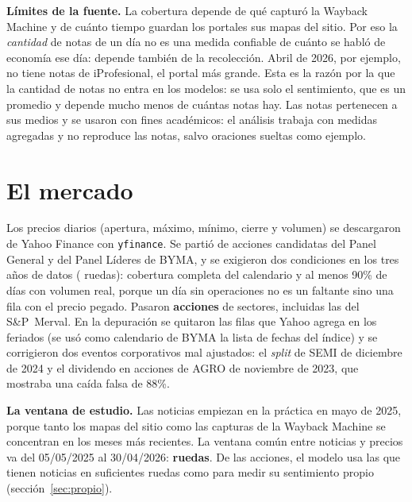 \textbf{Límites de la fuente.} La cobertura depende de qué capturó la Wayback Machine y de cuánto
tiempo guardan los portales sus mapas del sitio. Por eso la \textit{cantidad} de notas de un día
no es una medida confiable de cuánto se habló de economía ese día: depende también de la
recolección. Abril de 2026, por ejemplo, no tiene notas de iProfesional, el portal más grande. Esta
es la razón por la que la cantidad de notas no entra en los modelos: se usa solo el sentimiento,
que es un promedio y depende mucho menos de cuántas notas hay. Las notas pertenecen a sus medios y
se usaron con fines académicos: el análisis trabaja con medidas agregadas y no reproduce las
notas, salvo oraciones sueltas como ejemplo.

\section{El mercado}
\label{sec:panel}

Los precios diarios (apertura, máximo, mínimo, cierre y volumen) se descargaron de Yahoo Finance
con \texttt{yfinance}. Se partió de  acciones candidatas del Panel General
y del Panel Líderes de BYMA, y se exigieron dos condiciones en los tres años de datos
( ruedas): cobertura completa del calendario y al menos 90\% de días
con volumen real, porque un día sin operaciones no es un faltante sino una fila con el precio
pegado. Pasaron \textbf{ acciones} de  sectores,
incluidas las  del S\&P~Merval. En la depuración se quitaron las filas que
Yahoo agrega en los feriados (se usó como calendario de BYMA la lista de fechas del índice) y se
corrigieron dos eventos corporativos mal ajustados: el \textit{split} de SEMI de diciembre de 2024
y el dividendo en acciones de AGRO de noviembre de 2023, que mostraba una caída falsa de 88\%.

\textbf{La ventana de estudio.} Las noticias empiezan en la práctica en mayo de 2025, porque tanto
los mapas del sitio como las capturas de la Wayback Machine se concentran en los meses más
recientes. La ventana común entre noticias y precios va del 05/05/2025 al 30/04/2026:
\textbf{ ruedas}. De las  acciones, el modelo usa las
 que tienen noticias en suficientes ruedas como para medir su sentimiento
propio (sección~\ref{sec:propio}).
